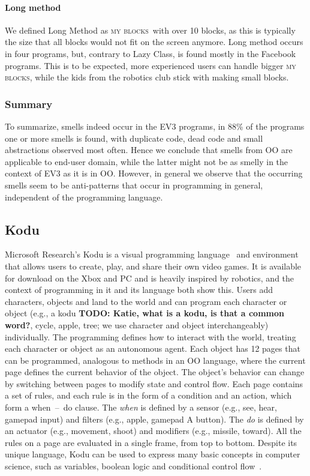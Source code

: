 \documentclass{sig-alternate}
\newcommand{\todo}[1]{\textbf{TODO: #1}}
\newcommand{\mbs}{\textsc{my blocks}}
\begin{document}
\paragraph{Long method}
We defined Long Method as \mbs~with over 10 blocks, as this is typically the size that all blocks would not fit on the screen anymore. Long method occurs in four programs, but, contrary to Lazy Class, is found mostly in the Facebook programs. This is to be expected, more experienced users can handle bigger \mbs, while the kids from the robotics club stick with making small blocks.

\subsubsection{Summary}
To summarize, smells indeed occur in the EV3 programs, in 88\% of the programs one or more smells is found, with duplicate code, dead code and small abstractions observed most often. Hence we conclude that smells from OO are applicable to end-user domain, while the latter might not be as smelly in the context of EV3 as it is in OO. However, in general we observe that the occurring smells seem to be anti-patterns that occur in programming in general, independent of the programming language. 

\subsection{Kodu}
Microsoft Research's Kodu is a visual programming language~\cite{kodugrammar} and environment that allows users to create, play, and share their own video games. 
It is available for download on the Xbox and PC and is heavily inspired by robotics, and the context of programming in it and its language both show this. 
Users add characters, objects and land to the world and can program each character or object (e.g., a kodu \todo{Katie, what is a kodu, is that a common word?}, cycle, apple, tree; we use character and object interchangeably) individually. The programming defines how to interact with the world, treating each character or object as an autonomous agent. Each object has 12 pages that can be programmed, analogous to methods in an OO language, where the current page defines the current behavior of the object. 
The object's behavior can change by switching between pages to modify state and control flow. 
Each page contains a set of rules, and each rule is in the form of a condition and an action, which form a when~--~do clause. The \emph{when} is defined by a sensor (e.g., see, hear, gamepad input) and filters (e.g., apple, gamepad A button). The \emph{do} is defined by an actuator (e.g., movement, shoot) and modifiers (e.g., missile, toward). All the rules on a page are evaluated in a single frame, from top to bottom. 
Despite its unique language, Kodu  can be used to express many basic concepts in computer science, such as variables, boolean logic and conditional control flow~\cite{Stolee:2011:ECS:1953163.1953197}. 
\end{document}
